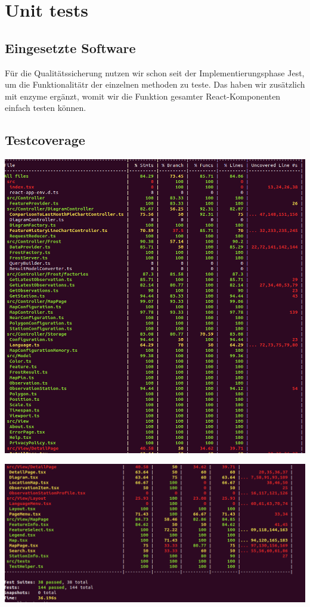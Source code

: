 \section{Unit tests}

\subsection{Eingesetzte Software}

Für die Qualitätssicherung nutzen wir schon seit der Implementierungsphase Jest, um die Funktionalitätr der einzelnen methoden zu teste. Das haben wir zusätzlich mit enzyme ergänzt, womit wir die Funktion gesamter React-Komponenten einfach testen können.

\subsection{Testcoverage}
\includegraphics[width=1\linewidth]{figures/Testcoverage1.png}\par\vspace{1cm}
\includegraphics[width=1\linewidth]{figures/Testcoverage2.png}\par\vspace{1cm}

